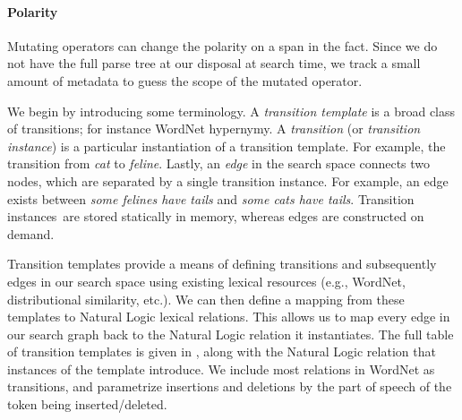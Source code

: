 \paragraph{Polarity}
Mutating operators can change the polarity on a span
  in the fact.
Since we do not have the full parse tree at our disposal at search time,
  we track a small amount of metadata to guess the scope of the
  mutated operator.


%
%
We begin by introducing some terminology.
A \textit{transition template} is a broad class of transitions; for
  instance WordNet hypernymy.
A \textit{transition} (or \textit{transition instance}) is a particular
  instantiation of a transition template.
For example, the transition from \textit{cat} to \textit{feline}.
Lastly, an \textit{edge} in the search space connects two nodes, which
  are separated by a single transition instance.
For example, an edge exists between 
  \textit{some felines have tails} and \textit{some cats have tails}.
Transition \lbrack instances\rbrack\ are stored statically in memory, 
  whereas edges are constructed on demand.

Transition templates provide a means of defining transitions and
  subsequently edges in our search space using existing lexical
  resources (e.g., WordNet, distributional similarity, etc.).
We can then define a mapping from these templates to Natural Logic
  lexical relations.
This allows us to map every edge in our search graph back to the
  Natural Logic relation it instantiates.
The full table of transition templates is given in ,
  along with the Natural Logic relation 
  that instances of the template introduce.
We include most relations in WordNet as transitions,
  and parametrize insertions and deletions by the part of speech
  of the token being inserted/deleted.

